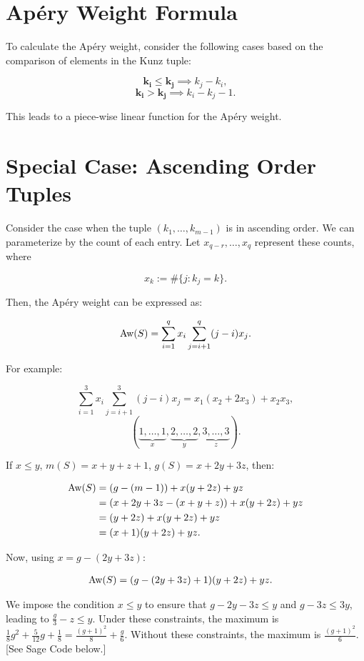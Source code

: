 \documentclass[11pt]{article}
\begin{document}
\section{Ap\'ery Weight Formula}

To calculate the Ap\'ery weight, consider the following cases based on the comparison of elements in the Kunz tuple:

\[
\mathbf{k_i \le k_j} \implies k_j - k_i,
\]
\[
\mathbf{k_i > k_j} \implies k_i - k_j - 1.
\]

This leads to a piece-wise linear function for the Ap\'ery weight.

\section{Special Case: Ascending Order Tuples}

Consider the case when the tuple \((k_1, \dots, k_{m-1})\) is in ascending order. We can parameterize by the count of each entry. Let \(x_{q-r},\dots, x_q\) represent these counts, where 

\[
x_k := \#\{j : k_j = k\}.
\]

Then, the Ap\'ery weight can be expressed as:

\[
\text{Aw}(S) = \sum\limits_{i=1}^q x_i \sum\limits_{j=i+1}^q (j - i) x_j.
\]

For example:

\[
\sum_{i=1}^{3} x_i \sum_{j=i+1}^{3} (j - i) x_j = x_1(x_2 + 2x_3) + x_2x_3,
\]
\[
(\underbrace{1,\dots, 1}_{x}, \underbrace{2, \dots, 2}_y, \underbrace{3, \dots, 3}_{z}).
\]

If \(x \le y\), \(m(S) = x + y + z + 1\), \(g(S) = x + 2y + 3z\), then:

\begin{align*}
    \text{Aw}(S) &= (g - (m-1)) + x(y + 2z) + yz \\
    &= (x + 2y + 3z - (x + y + z)) + x(y + 2z) + yz \\
    &= (y + 2z) + x(y + 2z) + yz \\
    &= (x + 1)(y + 2z) + yz.
\end{align*}

Now, using \(x = g - (2y + 3z)\):

\begin{align*}
    \text{Aw}(S) &= (g - (2y + 3z) + 1)(y + 2z) + yz.
\end{align*}

We impose the condition \(x \le y\) to ensure that \(g - 2y - 3z \le y\) and \(g - 3z \le 3y\), leading to \(\frac{g}{3} - z \le y\). Under these constraints, the maximum is \(\frac{1}{8}g^2 + \frac{5}{12}g + \frac{1}{8} = \frac{(g+1)^2}{8} + \frac{g}{6}\). Without these constraints, the maximum is \(\frac{(g+1)^2}{6}\). [See Sage Code below.]
\end{document}
